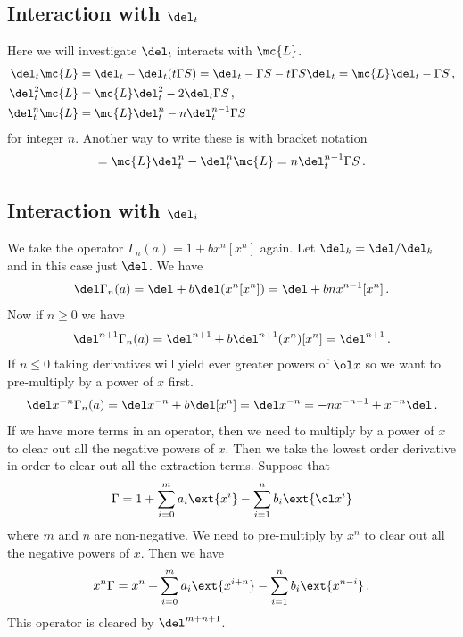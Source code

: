 \subsection{Interaction with $\del_t$}
Here we will investigate $\del_t$ interacts with $\mc{L}$.
\begin{align}
	\del_t \mc{L} &= \del_t - \del_t(t\Gamma S) = \del_t - \Gamma S- t\Gamma S\del_t = \mc{L}\del_t - \Gamma S\,,\\
	\del_t^2 \mc{L} &= \mc{L}\del_t^2 - 2\del_t \Gamma S\,,\\
	\del_t^n \mc{L} &=\mc{L} \del_t^n - n\del_t^{n-1}\Gamma S
\end{align}
for integer $n$. Another way to write these is with bracket notation
\begin{align}
	[\mc{L},\del_t^n] = \mc{L}\del_t^n-\del_t^n\mc{L} = n\del_t^{n-1}\Gamma S\,.
\end{align}

\subsection{Interaction with $\del_i$}
We take the operator $\Gamma_n(a) = 1 + b x^n[x^n]$ again. Let $\del_k = \del/\del_k$ and in this case just $\del$. We have
\begin{align}
	\del \Gamma_n(a) = \del + b\del(x^n[x^n]) = \del + bnx^{n-1}[x^n]\,.
\end{align}
Now if $n\ge 0$ we have
\begin{align}
	\del^{n+1}\Gamma_n(a)  = \del^{n+1} + b\del^{n+1}(x^n)[x^n] = \del^{n+1}\,.
\end{align}
If $n\leq 0$ taking derivatives will yield ever greater powers of $\ol x$ so we want to pre-multiply by a power of $x$ first.
\begin{align}
	\del x^{-n} \Gamma_{n}(a) = \del x^{-n} + b\del [x^n] = \del x^{-n} = -nx^{-n-1} + x^{-n}\del\,.
\end{align}
If we have more terms in an operator, then we need to multiply by a power of $x$ to clear out all the negative powers of $x$. Then we take the lowest order derivative in order to clear out all the extraction terms. Suppose that
\begin{align}
	\Gamma = 1 + \sum_{i=0}^{m} a_i \ext{x^i} - \sum_{i=1}^n b_i\ext{\ol x^i}
\end{align}
where $m$ and $n$ are non-negative. We need to pre-multiply by $x^n$ to clear out all the negative powers of $x$. Then we have
\begin{align}
	x^n\Gamma = x^n + \sum_{i=0}^{m} a_i \ext{x^{i+n}} - \sum_{i=1}^n b_i\ext{x^{n-i}}\,.
\end{align}
This operator is cleared by $\del^{m+n+1}$.
\endinput
